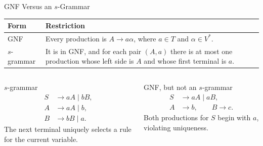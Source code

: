 \documentclass[10pt]{beamer}
\begin{document}
\begin{frame}{GNF Versus an $s$-Grammar}
  \small
  \begin{center}
  \begin{tabular}{L{3.1cm}L{7.0cm}}
    \toprule
    Form & Restriction \\
    \midrule
    GNF & Every production is $A\to a\alpha$, where $a\in T$ and
      $\alpha\in V^*$. \\
    $s$-grammar & It is in GNF, and for each pair $(A,a)$ there is at most one
      production whose left side is $A$ and whose first terminal is $a$. \\
    \bottomrule
  \end{tabular}
  \end{center}
  \begin{columns}[T]
    \begin{exampleblock}{$s$-grammar}
      \[
        \begin{aligned}
          S&\to aA\mid bB,\\
          A&\to aA\mid b,\\
          B&\to bB\mid a.
        \end{aligned}
      \]
      The next terminal uniquely selects a rule for the current variable.
    \end{exampleblock}
    \begin{alertblock}{GNF, but not an $s$-grammar}
      \[
        \begin{aligned}
          S&\to aA\mid aB,\\
          A&\to b,\qquad B\to c.
        \end{aligned}
      \]
      Both productions for $S$ begin with $a$, violating uniqueness.
    \end{alertblock}
  \end{columns}
\end{frame}
\end{document}
